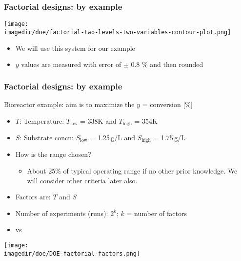 \begin{frame}\frametitle{Factorial designs: by example}
	\begin{center}
		\texttt{[image: \\imagedir/doe/factorial-two-levels-two-variables-contour-plot.png]}
	\end{center}
	\begin{itemize}
		\item	We will use this system for our example
		\item	$y$ values are measured with error of $\pm$ 0.8 \% and then rounded
	\end{itemize}
\end{frame}

\begin{frame}\frametitle{Factorial designs: by example}

	Bioreactor example: aim is to maximize the $y$ = conversion [\%]
	\begin{itemize}
		\item	$T$: Temperature: $T_\text{low}$ = 338K and $T_\text{high}$ = 354K
		\item	$S$: Substrate concn: $S_\text{low}$ = 1.25\,g/L and $S_\text{high}$ = 1.75\,g/L
		\item	How is the range chosen?
		\begin{itemize}
			\item	About 25\% of typical operating range if no other prior knowledge. We will consider other criteria later also.
		\end{itemize}
	\end{itemize}
	\begin{itemize}
		\item	Factors are: $T$ and $S$
		\item	Number of experiments (runs): $2^k$; $k$ = number of factors
		\item	{\color{purple}{Standard order}} vs {\color{purple}{Actual execution (run) order}}
	\end{itemize}
	\begin{center}
		\texttt{[image: \\imagedir/doe/DOE-factorial-factors.png]}
	\end{center}
\end{frame}


